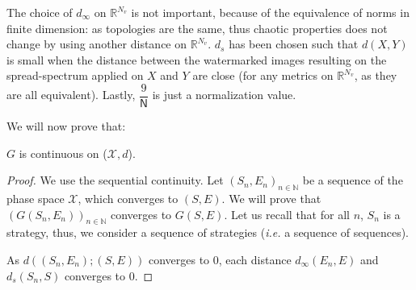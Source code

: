 \documentclass{llncs}
\begin{document}
The choice of $d_{\infty}$ on $\mathds{R}^{N_v}$ is not important, because of the equivalence of norms in finite dimension: as topologies are the same, thus chaotic properties does not change by using another distance on $\mathds{R}^{N_v}$. $d_s$ has been chosen such that $d(X,Y)$ is small when the distance between the watermarked images resulting on the spread-spectrum applied on $X$ and $Y$ are close (for any metrics on $\mathds{R}^{N_v}$, as they are all equivalent). Lastly, $\dfrac{9}{\mathsf{N}}$ is just a normalization value.

We will now prove that:

\begin{proposition}
$G$ is continuous on ($\mathcal{X},d$).
\end{proposition}


\begin{proof}
We use the sequential continuity. Let $(S_n,E_n)_{n\in \mathds{N}}$ be a sequence of the phase space $\mathcal{X}$, which converges to $(S,E)$. We will prove that $\left( G(S_n,E_n)\right)_{n\in \mathds{N}}$ converges to $G(S,E)$. Let us recall that for all $n$, $S_n$ is a strategy, thus, we consider a sequence of strategies (\emph{i.e.} a sequence of sequences).

As $d((S_n,E_n);(S,E))$ converges to 0, each distance $d_{\infty}(E_n,E)$ and $d_s(S_n,S)$ converges to 0. 

\end{proof}
\end{document}
